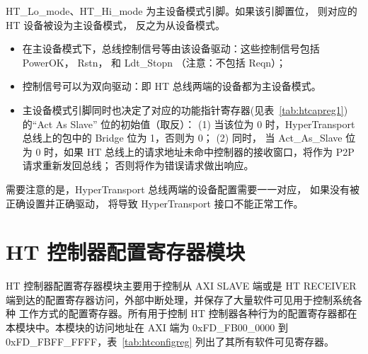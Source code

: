 HT\_Lo\_mode、HT\_Hi\_mode 为主设备模式引脚。如果该引脚置位， 则对应的
HT 设备被设为主设备模式， 反之为从设备模式。
\begin{itemize}
  \item 在主设备模式下，总线控制信号等由该设备驱动：这些控制信号包括 PowerOK，
    Rstn， 和 Ldt\_Stopn （注意：不包括 Reqn）；

  \item 控制信号可以为双向驱动：即 HT 总线两端的设备都为主设备模式。

  \item 主设备模式引脚同时也决定了对应的功能指针寄存器(见表~\ref{tab:htcapreg1})的``Act As
    Slave'' 位的初始值（取反）： (1) 当该位为 0 时，HyperTransport 总线上的包中的
    Bridge 位为 1，否则为 0； (2) 同时， 当 Act\_As\_Slave 位为 0 时，如果 HT
    总线上的请求地址未命中控制器的接收窗口，将作为 P2P 请求重新发回总线；
    否则将作为错误请求做出响应。
\end{itemize}
需要注意的是，HyperTransport 总线两端的设备配置需要一一对应，
如果没有被正确设置并正确驱动， 将导致 HyperTransport 接口不能正常工作。


\section{HT 控制器配置寄存器模块}

HT 控制器配置寄存器模块主要用于控制从 AXI SLAVE 端或是 HT RECEIVER
端到达的配置寄存器访问，外部中断处理，并保存了大量软件可见用于控制系统各种
工作方式的配置寄存器。所有用于控制
HT 控制器各种行为的配置寄存器都在本模块中。本模块的访问地址在 AXI 端为
0xFD\_FB00\_0000 到 0xFD\_FBFF\_FFFF，表~\ref{tab:htconfigreg}
列出了其所有软件可见寄存器。


